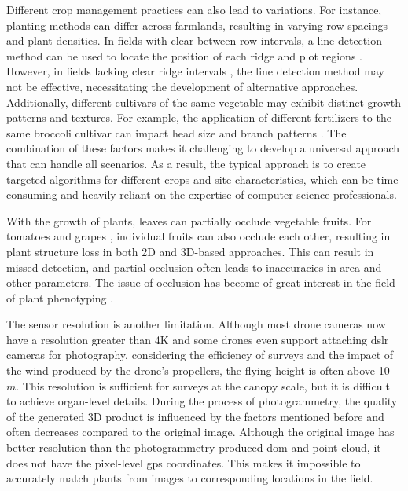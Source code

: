 Different crop management practices can also lead to variations. For instance, planting methods can differ across farmlands, resulting in varying row spacings and plant densities. In fields with clear between-row intervals, a line detection method can be used to locate the position of each ridge and plot regions \citep[Fig.~1]{tresch_easympe_2019}. However, in fields lacking clear ridge intervals \citep[Fig.~3]{faye_toolbox_2016}, the line detection method may not be effective, necessitating the development of alternative approaches. Additionally, different cultivars of the same vegetable may exhibit distinct growth patterns and textures. For example, the application of different fertilizers to the same broccoli cultivar can impact head size and branch patterns \citep{nishida_estimation_2023}. The combination of these factors makes it challenging to develop a universal approach that can handle all scenarios. As a result, the typical approach is to create targeted algorithms for different crops and site characteristics, which can be time-consuming and heavily reliant on the expertise of computer science professionals.

With the growth of plants, leaves can partially occlude vegetable fruits. For tomatoes \citep[Fig.~2a]{yamamoto_plant_2014} and grapes \citep[Fig.~1]{liang_segmentation_2022}, individual fruits can also occlude each other, resulting in plant structure loss in both 2D and 3D-based approaches. This can result in missed detection, and partial occlusion often leads to inaccuracies in area and other parameters. The issue of occlusion has become of great interest in the field of plant phenotyping \citep{blok_image_2021, boogaard_robust_2020, lehnert_3d_2019}.

The sensor resolution is another limitation. Although most drone cameras now have a resolution greater than 4K and some drones even support attaching \gls{dslr} cameras for photography, considering the efficiency of surveys and the impact of the wind produced by the drone's propellers, the flying height is often above 10 $m$. This resolution is sufficient for surveys at the canopy scale, but it is difficult to achieve organ-level details. During the process of photogrammetry, the quality of the generated 3D product is influenced by the factors mentioned before and often decreases compared to the original image. Although the original image has better resolution than the photogrammetry-produced \gls{dom} and point cloud, it does not have the pixel-level \gls{gps} coordinates. This makes it impossible to accurately match plants from images to corresponding locations in the field.


